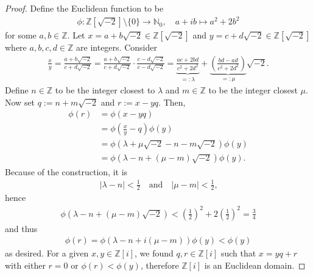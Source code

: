 \begin{proof}
    Define the Euclidean function to be
    \begin{align*}
        \phi: \mathbb{Z}[\sqrt{-2}] \setminus \{0\} \longrightarrow \mathbb{N}_0, \quad a + ib \mapsto a^2 + 2 b^2
    \end{align*}
    for some \(a, b \in \mathbb{Z}\). Let \(x = a + b \sqrt{-2} \in \mathbb{Z}[\sqrt{-2}]\) and \(y = c + d \sqrt{-2} \in \mathbb{Z}[\sqrt{-2}]\) where \(a, b, c, d \in \mathbb{Z}\) are integers. Consider
    \begin{align*}
        \frac{x}{y} = \frac{a + b \sqrt{-2}}{c + d \sqrt{-2}} = \frac{a + b \sqrt{-2}}{c + d \sqrt{-2}} \cdot \frac{c - d \sqrt{-2}}{c - d \sqrt{-2}} = \underbrace{\frac{ac + 2bd}{c^2 + 2 d^2}}_{=: \lambda} + \underbrace{\left(\frac{bd - ad}{c^2 + 2 d^2} \right)}_{=: \mu} \sqrt{-2} \text{.}
    \end{align*}
    Define \(n \in \mathbb{Z}\) to be the integer closest to \(\lambda\) and \(m \in \mathbb{Z}\) to be the integer closest \(\mu\). Now set \(q := n + m \sqrt{-2}\) and \(r := x - yq\). Then,
    \begin{align*}
        \phi(r) &= \phi(x - yq) \\
        &= \phi \left(\frac{x}{y} - q\right) \phi(y) \\
        &= \phi(\lambda + \mu \sqrt{-2} - n - m \sqrt{-2}) \phi(y) \\
        &= \phi(\lambda - n + (\mu - m) \sqrt{-2}) \phi(y) \text{.}
    \end{align*}
    Because of the construction, it is
    \begin{align*}
        |\lambda - n| < \frac{1}{2} \quad \text{and} \quad |\mu - m| < \frac{1}{2} \text{,}
    \end{align*}
    hence
    \begin{align*}
        \phi(\lambda - n + (\mu - m) \sqrt{-2}) < \left(\frac{1}{2}\right)^2 + 2 \left(\frac{1}{2}\right)^2 = \frac{3}{4}
    \end{align*}
    and thus
    \begin{align*}
        \phi(r) = \phi(\lambda - n + i (\mu - m)) \phi(y) < \phi(y)
    \end{align*}
    as desired. For a given \(x, y \in \mathbb{Z}[i]\), we found \(q, r \in \mathbb{Z}[i]\) such that \(x = yq + r\) with either \(r = 0\) or \(\phi(r) < \phi(y)\), therefore \(\mathbb{Z}[i]\) is an Euclidean domain.
\end{proof}

